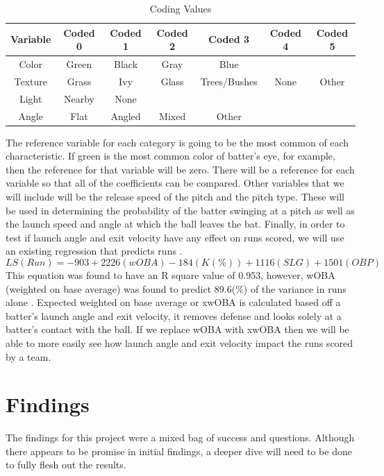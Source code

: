 \documentclass{article}
\begin{document}
\begin{doublespace}
\begin{table}[ht]
\caption{Coding Values}
\centering
\begin{tabular}{c c c c c c c}
\hline\hline
Variable & Coded 0 & Coded 1 & Coded 2 & Coded 3 & Coded 4 & Coded 5 \\ [0.5ex]
\hline
Color & Green & Black & Gray & Blue  \\
Texture & Grass & Ivy & Glass & Trees/Bushes & None & Other \\
Light & Nearby & None \\
Angle & Flat & Angled & Mixed & Other \\

\hline
\end{tabular}
\label{table:Optimal}
\end{table}

The reference variable for each category is going to be the most common of each characteristic. If green is the most common color of batter’s eye, for example, then the reference for that variable will be zero. There will be a reference for each variable so that all of the coefficients can be compared. Other variables that we will include will be the release speed of the pitch and the pitch type. These will be used in determining the probability of the batter swinging at a pitch as well as the launch speed and angle at which the ball leaves the bat. 
	Finally, in order to test if launch angle and exit velocity have any effect on runs scored, we will use an existing regression that predicts runs \citep{Beneventano}. 
$$LS(Run)= -903 +2226(wOBA)-184(K(\%)) +1116(SLG) +1501(OBP)$$
	This equation was found to have an R square value of 0.953, however, wOBA (weighted on base average) was found to predict 89.6(\%) of the variance in runs alone \citep{Beneventano}. Expected weighted on base average or xwOBA is calculated based off a batter’s launch angle and exit velocity, it removes defense and looks solely at a batter’s contact with the ball. If we replace wOBA with xwOBA then we will be able to more easily see how launch angle and exit velocity impact the runs scored by a team. 

\section{Findings}

The findings for this project were a mixed bag of success and questions. Although there appears to be promise in initial findings, a deeper dive  will need to be done to fully flesh out the results. \\


\end{doublespace}
\end{document}
